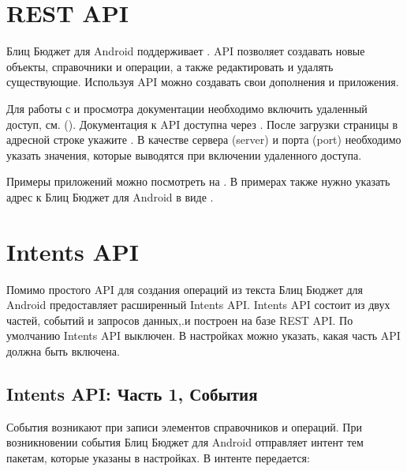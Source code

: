\documentclass[a4paper,10pt,russian]{sphinxmanual}
\begin{document}
\section{REST API}
\label{\detokenize{api:rest-api}}\label{\detokenize{api:sub-chapter-rest-api}}
\sphinxAtStartPar
Блиц Бюджет для Android поддерживает . API позволяет создавать новые объекты, справочники и операции, а также редактировать и удалять существующие. Используя API
можно создавать свои дополнения и приложения.

\sphinxAtStartPar
Для работы с  и просмотра документации необходимо включить удаленный доступ, см. {\hyperref[\detokenize{remote-access:chapter-remote-access}]{}} ().
Документация к API доступна через . После загрузки страницы в адресной строке  укажите .
В качестве сервера (server) и порта (port) необходимо указать значения, которые выводятся при включении удаленного доступа.

\sphinxAtStartPar
Примеры приложений можно посмотреть на . В примерах также нужно указать адрес к Блиц Бюджет для Android в виде .


\section{Intents API}
\label{\detokenize{api:intents-api}}
\sphinxAtStartPar
Помимо простого API для создания операций из текста Блиц Бюджет для Android предоставляет расширенный Intents API.
Intents API  состоит из двух частей, событий и запросов данных,.и построен на базе REST API.
По умолчанию Intents API выключен. В настройках можно указать, какая часть API должна быть включена.


\subsection{Intents API: Часть 1, События}
\label{\detokenize{api:intents-api-1}}
\sphinxAtStartPar
События возникают при записи элементов справочников и операций. При возникновении события Блиц Бюджет для Android отправляет интент тем пакетам,
которые указаны в настройках. В интенте передается:
\end{document}
